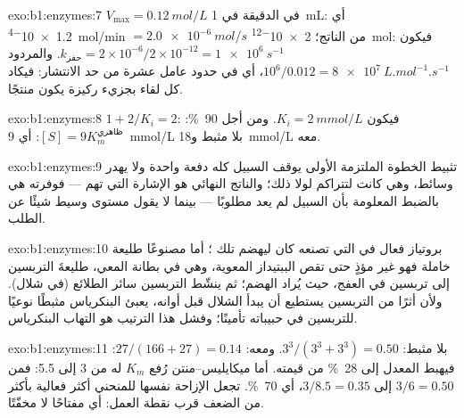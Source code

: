 \begin{solution}{exo:b1:enzymes:7}
$V_{\max} = \qty{0.12}{mol/L}$ في الدقيقة في \qty{1}{mL}: أي
\qty{1.2e-4}{mol/min} $= \qty{2.0e-6}{mol/s}$ من الناتج؛ 
\qty{2e-12}{mol}: فيكون
$k_{\text{حفز}} = 2\times 10^{-6}/2\times 10^{-12} =
\qty{1e6}{s^{-1}}$.
والمردود $10^6/0.012 = \qty{8e7}{L.mol^{-1}.s^{-1}}$، أي في حدود عامل
عشرة من حد الانتشار: فيكاد كل لقاء بجزيء ركيزة يكون منتجًا.
\end{solution}

\begin{solution}{exo:b1:enzymes:8}
$1 + 2/K_i = 2$: فيكون $K_i = \qty{2}{mmol/L}$. ومن أجل \qty{90}{\%}:
$[S] = 9K_m^{\text{ظاهري}}$: أي \qty{9}{mmol/L} بلا مثبط
و\qty{18}{mmol/L} معه.
\end{solution}

\begin{solution}{exo:b1:enzymes:9}
تثبيط الخطوة الملتزمة الأولى يوقف السبيل كله دفعة واحدة ولا يهدر
وسائط، وهي كانت لتتراكم لولا ذلك؛ والناتج النهائي هو الإشارة التي
تهم --- فوفرته هي بالضبط المعلومة بأن السبيل لم يعد مطلوبًا --- بينما
لا يقول مستوى وسيط شيئًا عن الطلب.
\end{solution}

\begin{solution}{exo:b1:enzymes:10}
بروتياز فعال في  التي تصنعه كان ليهضم تلك ؛ أما مصنوعًا
طليعة خاملة فهو غير مؤذٍ حتى تقص الببتيداز المعوية، وهي  في بطانة
المعي، طليعةَ التربسين إلى تربسين في العفج، حيث يُراد الهضم؛ ثم ينشّط
التربسين سائر الطلائع (في شلال). ولأن أثرًا من التربسين يستطيع أن
يبدأ الشلال قبل أوانه، يعبئ البنكرياس مثبطًا نوعيًا للتربسين في
حبيباته تأمينًا؛ وفشل هذا الترتيب هو التهاب البنكرياس.
\end{solution}

\begin{solution}{exo:b1:enzymes:11}
بلا مثبط: $3^3/(3^3 + 3^3) = 0.50$. ومعه: $27/(166 + 27) = 0.14$:
فيهبط المعدل إلى \qty{28}{\%} من قيمته. أما  ميكايليس--منتن رُفع
$K_m$ له من 3 إلى 5.5: فمن $3/6 = 0.50$ إلى $3/8.5 = 0.35$، أي
\qty{70}{\%}.  تجعل الإزاحة نفسها للمنحني أكثر فعالية بأكثر
من الضعف قرب نقطة العمل: أي مفتاحًا لا مخفّتًا.
\end{solution}

